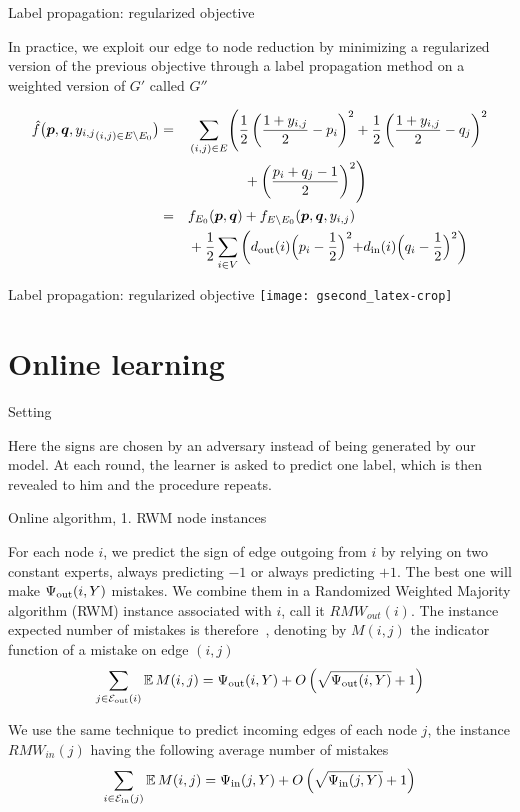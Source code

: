\documentclass[svgnames,ignorenonframetext,final]{beamer}
\begin{document}
\begin{frame}{Label propagation: regularized objective}

In practice, we exploit our edge to node reduction by minimizing a
regularized version of the previous objective through a label
propagation method on a weighted version of \(G'\) called \(G''\)

\begin{alignat*}{5}
{\hat f}\big(\boldsymbol{p},\boldsymbol{q},{y_{i,j}}_{(i,j) \in E\setminus E_0}\big) 
&= &&\sum_{(i,j) \in E} 
\Biggl(
  \frac{1}{2}\left(\frac{1+y_{i,j}}{2}-p_i\right)^2 +
  \frac{1}{2}\left(\frac{1+y_{i,j}}{2}-q_j\right)^2 \\
  &\, &&\qquad\qquad+ \left(\frac{p_i+q_j-1}{2}\right)^2
\Biggr)\\
&= &&f_{E_0}(\boldsymbol{p},\boldsymbol{q}) + f_{E\setminus E_0}(\boldsymbol{p},\boldsymbol{q}, {y_{i,j}}) \\
&\, &&+ \frac{1}{2}\sum_{i\in V}
\left(d_{\mathrm{out}}(i)\Bigl(p_i-\frac{1}{2}\Bigl)^2+d_{\mathrm{in}}(i)\Bigl(q_i-\frac{1}{2}\Bigl)^2\right) 
\end{alignat*}

\end{frame}

\begin{frame}{Label propagation: regularized objective}
\texttt{[image: gsecond\_latex-crop]}
\end{frame}


\section{Online learning}\label{online-learning}

\begin{frame}{Setting}

Here the signs are chosen by an adversary instead of being generated by
our model. At each round, the learner is asked to predict one label,
which is then revealed to him and the procedure repeats.

\end{frame}

\begin{frame}{Online algorithm, 1. RWM node instances}

For each node \(i\), we predict the sign of edge outgoing from \(i\) by
relying on two constant experts, always predicting \(-1\) or always
predicting \(+1\). The best one will make \(\Psi_{\mathrm{out}}(i, Y)\) mistakes. We
combine them in a Randomized Weighted Majority algorithm (RWM) instance
associated with \(i\), call it \(RMW_{out}(i)\). The instance expected
number of mistakes is therefore~\autocite{acg02},
denoting by \(M(i,j)\) the indicator function of a mistake on edge
\((i,j)\)
\[\sum_{j \in \mathcal{E}_{\mathrm{out}}(i)} \mathbb{E}\,M(i,j) = \Psi_{\mathrm{out}}(i,Y) + O\left(\sqrt{\Psi_{\mathrm{out}}(i,Y)}+ 1\right)\]

We use the same technique to predict incoming edges of each node \(j\),
the instance \(RMW_{in}(j)\) having the following average number of
mistakes
\[\sum_{i \in \mathcal{E}_{\mathrm{in}}(j)} \mathbb{E}\,M(i,j) = \Psi_{\mathrm{in}}(j,Y) + O\left(\sqrt{\Psi_{\mathrm{in}}(j,Y)} + 1\right)\]

\end{frame}
\end{document}
